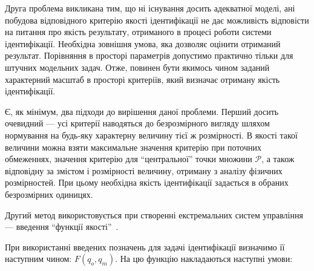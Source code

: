 Друга проблема викликана тим, що ні існування досить
адекватної моделі, ані побудова відповідного критерію якості
ідентифікації не дає можливість відповісти на питання
про якість результату, отриманого в процесі роботи системи
ідентифікації. Необхідна зовнішня умова, яка дозволяє оцінити
отриманий результат. Порівняння в просторі параметрів допустимо
практично тільки для штучних модельних задач. Отже, повинен
бути якимось чином заданий характерний масштаб в просторі
критеріїв, який визначає отриману якість ідентифікації.

Є, як мінімум, два підходи до вирішення даної проблеми. Перший
досить очевидний --- усі критерії наводяться до безрозмірного
вигляду шляхом нормування на будь-яку характерну величину тієї ж
розмірності. В якості такої величини можна взяти максимальне
значення критерію при поточних обмеженнях, значення критерію
для ``центральної'' точки множини $\mathcal{P}$,
а також відповідну за змістом і розмірності величину,
отриману з аналізу фізичних розмірностей. При цьому необхідна
якість ідентифікації задається в обраних безрозмірних одиницях.

Другий метод використовується при створенні екстремальних систем управління ---
введення ``функції якості''~\cite{eykhoff_modern_id,info_cipkin}.

При використанні введених позначень для задачі ідентифікації
визначимо її наступним чином:
\label{atu:d:F}$F(q_o, q_m)$.
На цю функцію накладаються наступні умови:

